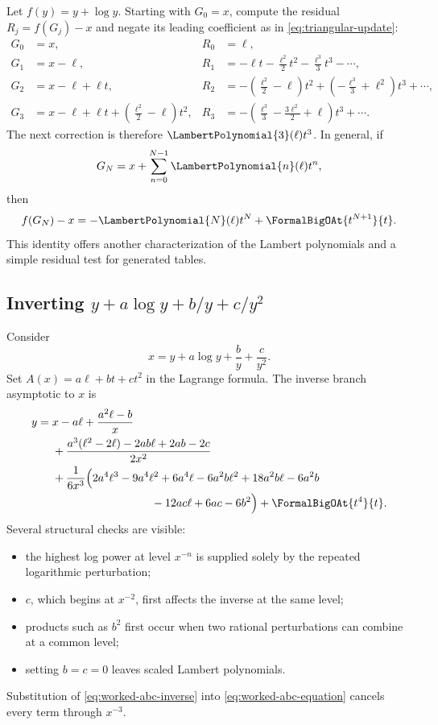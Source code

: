 \documentclass[11pt,oneside]{article}
\numberwithin{equation}{section}
\theoremstyle{definition}
\begin{document}
Let \(f(y)=y+\log y\).  Starting with \(G_0=x\), compute the residual
\(R_j=f(G_j)-x\) and negate its leading coefficient as in
\eqref{eq:triangular-update}:
\begin{align*}
 G_0&=x,
 &R_0&=\ell,\\
 G_1&=x-\ell,
 &R_1&=-\ell t-\frac{\ell^2}{2}t^2-\frac{\ell^3}{3}t^3-\cdots,\\
 G_2&=x-\ell+\ell t,
 &R_2&=-\left(\frac{\ell^2}{2}-\ell\right)t^2
      +\left(-\frac{\ell^3}{3}+\ell^2\right)t^3+\cdots,\\
 G_3&=x-\ell+\ell t+
       \left(\frac{\ell^2}{2}-\ell\right)t^2,
 &R_3&=-\left(\frac{\ell^3}{3}-\frac{3\ell^2}{2}+\ell\right)t^3
      +\cdots.
\end{align*}
The next correction is therefore \(\LambertPolynomial{3}(\ell)t^3\).  In general, if
\[
  G_N=x+\sum_{n=0}^{N-1}\LambertPolynomial{n}(\ell)t^n,
\]
then
\begin{equation}\label{eq:Lambert-residual-staircase}
  f(G_N)-x=-\LambertPolynomial{N}(\ell)t^N+\FormalBigOAt{t^{N+1}}{t}.
\end{equation}
This identity offers another characterization of the Lambert polynomials and a
simple residual test for generated tables.

\subsection{Inverting \(y+a\log y+b/y+c/y^2\)}

Consider
\begin{equation}\label{eq:worked-abc-equation}
  x=y+a\log y+\frac{b}{y}+\frac{c}{y^2}.
\end{equation}
Set \(A(x)=a\ell+bt+ct^2\) in the Lagrange formula.  The inverse branch
asymptotic to \(x\) is
\begin{align}
 y={}&x-a\ell
 +\frac{a^2\ell-b}{x}\nonumber\\
 &+\frac{a^3(\ell^2-2\ell)-2ab\ell+2ab-2c}{2x^2}
 \nonumber\\
 &+\frac{1}{6x^3}\Bigl(
 2a^4\ell^3-9a^4\ell^2+6a^4\ell
 -6a^2b\ell^2+18a^2b\ell-6a^2b\nonumber\\
 &\hspace{31mm}-12ac\ell+6ac-6b^2\Bigr)
 +\FormalBigOAt{t^4}{t}.
 \label{eq:worked-abc-inverse}
\end{align}
Several structural checks are visible:
\begin{itemize}
\item the highest log power at level \(x^{-n}\) is supplied solely by the
  repeated logarithmic perturbation;
\item \(c\), which begins at \(x^{-2}\), first affects the inverse at the same
  level;
\item products such as \(b^2\) first occur when two rational perturbations can
  combine at a common level;
\item setting \(b=c=0\) leaves scaled Lambert polynomials.
\end{itemize}
Substitution of \eqref{eq:worked-abc-inverse} into
\eqref{eq:worked-abc-equation} cancels every term through \(x^{-3}\).
\end{document}
